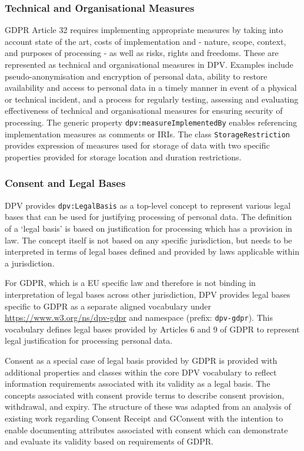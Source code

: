 \subsubsection{Technical and Organisational Measures}
GDPR Article 32 requires implementing appropriate measures by taking into account state of the art, costs of implementation and - nature, scope, context, and purposes of processing - as well as risks, rights and freedoms.
These are represented as technical and organisational measures in DPV.
Examples include pseudo-anonymisation and encryption of personal data, ability to restore availability and access to personal data in a timely manner in event of a physical or technical incident, and a process for regularly testing, assessing and evaluating effectiveness of technical and organisational measures for ensuring security of processing.
The generic property \texttt{dpv:measureImplementedBy} enables referencing implementation measures as comments or IRIs.
The class \texttt{StorageRestriction} provides expression of measures used for storage of data with two specific properties provided for storage location and duration restrictions.

\subsubsection{Consent and Legal Bases}
DPV provides \texttt{dpv:LegalBasis} as a top-level concept to represent various legal bases that can be used for justifying processing of personal data.
The definition of a `legal basis' is based on justification for processing which has a provision in law. The concept itself is not based on any specific jurisdiction, but needs to be interpreted in terms of legal bases defined and provided by laws applicable within a jurisdiction.

For GDPR, which is a EU specific law and therefore is not binding in interpretation of legal bases across other jurisdiction, DPV provides legal bases specific to GDPR as a separate aligned vocabulary under \url{https://www.w3.org/ns/dpv-gdpr} and namespace (prefix: \texttt{dpv-gdpr}). 
This vocabulary defines legal bases provided by Articles 6 and 9 of GDPR to represent legal justification for processing personal data.

Consent as a special case of legal basis provided by GDPR is provided with additional properties and classes within the core DPV vocabulary to reflect  information requirements associated with its validity as a legal basis.
The concepts associated with consent provide terms to describe consent provision, withdrawal, and expiry.
The structure of these was adapted from an analysis of existing work regarding Consent Receipt \cite{lizar_consent_2017} and GConsent \cite{pandit_gconsent_2019} with the intention to enable documenting attributes associated with consent which can demonstrate and evaluate its validity based on requirements of GDPR.

